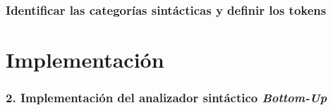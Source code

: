\documentclass[12pt]{article}
\begin{document}
\subsubsection*{Identificar las categorías sintácticas y definir los tokens}

\section{Implementación}
\subsubsection*{2. Implementación del analizador sintáctico \textit{Bottom-Up}}
\end{document}
